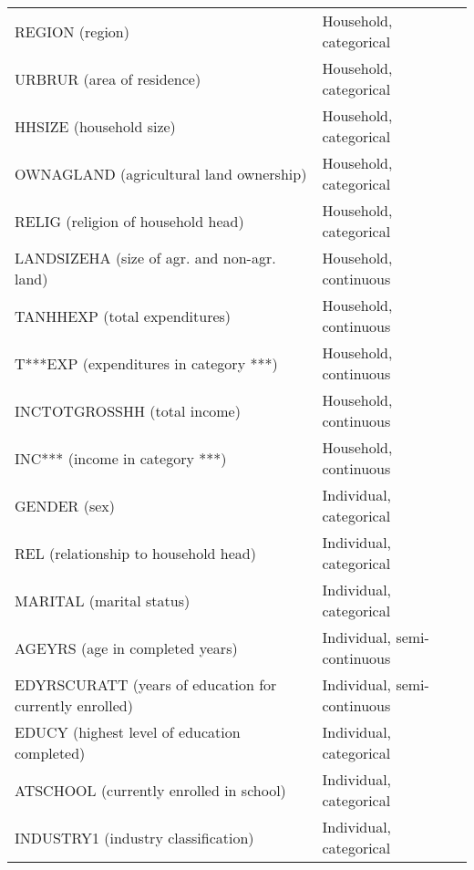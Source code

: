 \documentclass[letterpaper,10pt,english]{sphinxmanual}
\begin{document}
\begin{savenotes}\sphinxattablestart
\centering
\begin{tabulary}{\linewidth}[t]{|T|T|}
\hline
\sphinxstyletheadfamily 
{}
&\sphinxstyletheadfamily 
{}
\\
\hline
REGION (region)
&
Household, categorical
\\
\hline
URBRUR (area of residence)
&
Household, categorical
\\
\hline
HHSIZE (household size)
&
Household, categorical
\\
\hline
OWNAGLAND (agricultural land
ownership)
&
Household, categorical
\\
\hline
RELIG (religion of household
head)
&
Household, categorical
\\
\hline
LANDSIZEHA (size of agr. and
non-agr. land)
&
Household, continuous
\\
\hline
TANHHEXP (total expenditures)
&
Household, continuous
\\
\hline
T***EXP (expenditures in category
***)
&
Household, continuous
\\
\hline
INCTOTGROSSHH (total income)
&
Household, continuous
\\
\hline
INC*** (income in category ***)
&
Household, continuous
\\
\hline
GENDER (sex)
&
Individual, categorical
\\
\hline
REL (relationship to household
head)
&
Individual, categorical
\\
\hline
MARITAL (marital status)
&
Individual, categorical
\\
\hline
AGEYRS (age in completed years)
&
Individual, semi-continuous
\\
\hline
EDYRSCURATT (years of education
for currently enrolled)
&
Individual, semi-continuous
\\
\hline
EDUCY (highest level of education
completed)
&
Individual, categorical
\\
\hline
ATSCHOOL (currently enrolled in
school)
&
Individual, categorical
\\
\hline
INDUSTRY1 (industry
classification)
&
Individual, categorical
\\
\hline
\end{tabulary}
\par
\sphinxattableend\end{savenotes}

\end{document}

